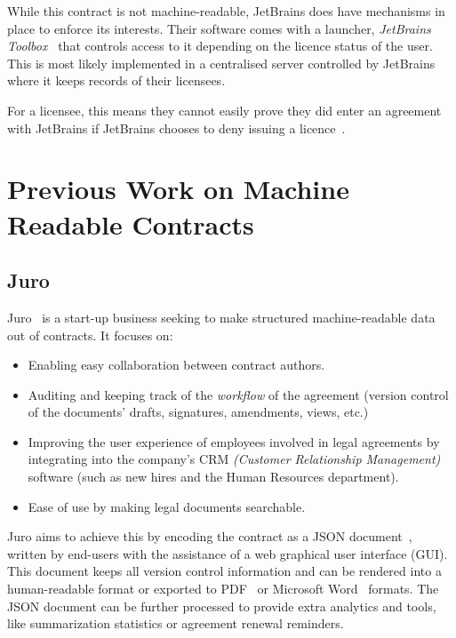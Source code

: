 While this contract is not machine-readable, JetBrains does have mechanisms in place to enforce its interests.
Their software comes with a launcher, \textit{JetBrains Toolbox}~\cite{jetbrainsToolbox} that controls access to it
depending on the licence status of the user.
This is most likely implemented in a centralised server controlled by JetBrains where it keeps records
of their licensees.

For a licensee, this means they cannot easily prove they did enter an agreement with JetBrains if JetBrains chooses
to deny issuing a licence~\citeTODO.


\section{Previous Work on Machine Readable Contracts}\label{sec:machine-readable-contracts}

\subsection{Juro}\label{subsec:juro}
Juro~\cite{juroWhitepaper} is a start-up business seeking to make structured machine-readable data out of contracts.
It focuses on:
\begin{itemize}
    \item Enabling easy collaboration between contract authors.
    \item Auditing and keeping track of the \textit{workflow} of the agreement (version control of the documents'
    drafts, signatures, amendments, views, etc.)
    \item Improving the user experience of employees involved in legal agreements by integrating into the company's CRM
    \textit{(Customer Relationship Management)} software (such as new hires and the Human Resources department).
    \item Ease of use by making legal documents searchable.
\end{itemize}

Juro aims to achieve this by encoding the contract as a JSON document~\cite{jsonSpec}, written by end-users
with the assistance of a web graphical user interface (GUI).
This document keeps all version control information and can be rendered into a human-readable format or exported
to PDF~\cite{pdf2020spec} or Microsoft Word~\cite{microsoftWordWeb} formats.
The JSON document can be further processed to provide extra analytics and tools, like summarization statistics or
agreement renewal reminders.\\

